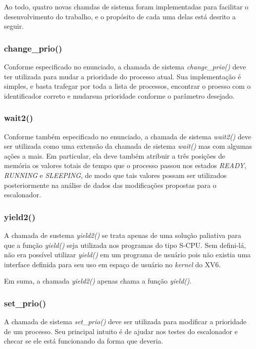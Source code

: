 \documentclass{article}
\begin{document}
Ao todo, quatro novas chamdas de sistema foram implementadas para facilitar o
desenvolvimento do trabalho, e o propósito de cada uma delas está desrito a
seguir.

\subsubsection{change\_prio()}

Conforme especificado no enunciado, a chamada de sistema
\textit{change\_prio()} deve ter utilizada para mudar
a prioridade do processo atual. Sua implementação é simples, e basta trafegar
por toda a lista de processos, encontrar o proesso com o identificador correto
e mudarsua prioridade conforme o parâmetro desejado.

\subsubsection{wait2()}

Conforme também especificado no enunciado, a chamada de sistema
\textit{wait2()} deve ser utilizada como uma
extensão da chamada de sistema \textit{wait()} mas com algumas ações a mais. Em
particular, ela deve também atribuir a três posições de memória os valores
totais de tempo que o processo passou nos estados \textit{READY},
\textit{RUNNING} e \textit{SLEEPING}, de modo que tais valores possam ser
utilizados posteriormente na análise de dados das modificações propostas para o
escalonador.

\subsubsection{yield2()}

A chamada de sustema \textit{yield2()} se trata apenas de uma solução paliativa
para que a função \textit{yield()} seja utilizada
nos programas do tipo S-CPU. Sem defini-lá, não era possível utilizar
\textit{yield()} em um programa de usuário pois não existia uma interface
definida para seu uso em espaço de usuário no \textit{kernel} do XV6.

Em suma, a chamada \textit{yield2()} apenas chama a função \textit{yield()}.

\subsubsection{set\_prio()}

A chamada de sistema \textit{set\_prio()} deve ser utilizada para modificar a
prioridade de um processo. Seu principal intuito é de ajudar nos testes do
escalonador e checar se ele está funcionando da forma que deveria.
\end{document}
